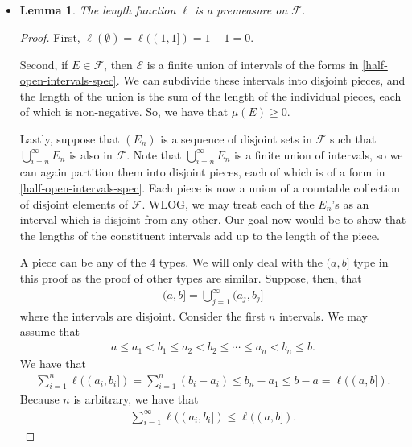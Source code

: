 \documentclass[10pt]{article}
\newtheorem{lemma}{Lemma}
\newcommand{\mcal}[1]{\mathcal{#1}}
\begin{document}
\begin{itemize}
  \item \begin{lemma}
  The length function $\ell$ is a premeasure on $\mcal{F}$.
  \end{lemma}

  \begin{proof}
    First, $\ell(\emptyset) = \ell((1,1]) = 1 - 1 = 0$.

    Second, if $E \in \mcal{F}$, then $\mcal{E}$ is a finite union of intervals of the forms in \eqref{half-open-intervals-spec}. We can subdivide these intervals into disjoint pieces, and the length of the union is the sum of the length of the individual pieces, each of which is non-negative. So, we have that $\mu(E) \geq 0$.

    Lastly, suppose that $(E_n)$ is a sequence of disjoint sets in $\mcal{F}$ such that $\bigcup_{i=n}^\infty E_n$ is also in $\mcal{F}$. Note that $\bigcup_{i=n}^\infty E_n$ is a finite union of intervals, so we can again partition them into disjoint pieces, each of which is of a form in \eqref{half-open-intervals-spec}. Each piece is now a union of a countable collection of disjoint elements of $\mcal{F}$. WLOG, we may treat each of the $E_n$'s as an interval which is disjoint from any other. Our goal now would be to show that the lengths of the constituent intervals add up to the length of the piece.

    A piece can be any of the 4 types. We will only deal with the $(a,b]$ type in this proof as the proof of other types are similar. Suppose, then, that
    \begin{align*}
      (a,b] = \bigcup_{j=1}^\infty (a_j, b_j]
    \end{align*}
    where the intervals are disjoint. Consider the first $n$ intervals. We may assume that
    \begin{align*}
      a \leq a_1 < b_1 \leq a_2 < b_2 \leq \dotsb \leq a_n < b_n \leq b.
    \end{align*}
    We have that
    \begin{align*}
      \sum_{i=1}^n \ell((a_i, b_i]) = \sum_{i=1}^n (b_i - a_i) \leq b_n - a_1 \leq b-a = \ell((a,b]).
    \end{align*}
    Because $n$ is arbitrary, we have that    
    \begin{align*}
      \sum_{i=1}^\infty \ell((a_i, b_i]) \leq \ell((a,b]).
    \end{align*}


\end{proof}
\end{itemize}
\end{document}
